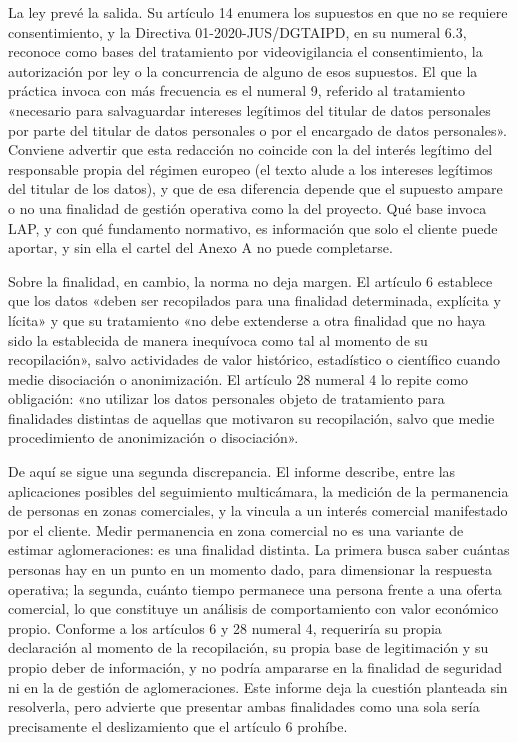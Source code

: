La ley prevé la salida. Su artículo 14 enumera los supuestos en que no
se requiere consentimiento, y la Directiva 01-2020-JUS/DGTAIPD, en su
numeral 6.3, reconoce como bases del tratamiento por videovigilancia el
consentimiento, la autorización por ley o la concurrencia de alguno de
esos supuestos. El que la práctica invoca con más frecuencia es el
numeral 9, referido al tratamiento «necesario para salvaguardar
intereses legítimos del titular de datos personales por parte del
titular de datos personales o por el encargado de datos personales».
Conviene advertir que esta redacción no coincide con la del interés
legítimo del responsable propia del régimen europeo (el texto alude a
los intereses legítimos del titular de los datos), y que de esa
diferencia depende que el supuesto ampare o no una finalidad de gestión
operativa como la del proyecto. Qué base invoca LAP, y con qué
fundamento normativo, es información que solo el cliente puede aportar,
y sin ella el cartel del Anexo A no puede completarse.

Sobre la finalidad, en cambio, la norma no deja margen. El artículo 6
establece que los datos «deben ser recopilados para una finalidad
determinada, explícita y lícita» y que su tratamiento «no debe
extenderse a otra finalidad que no haya sido la establecida de manera
inequívoca como tal al momento de su recopilación», salvo actividades de
valor histórico, estadístico o científico cuando medie disociación o
anonimización. El artículo 28 numeral 4 lo repite como obligación: «no
utilizar los datos personales objeto de tratamiento para finalidades
distintas de aquellas que motivaron su recopilación, salvo que medie
procedimiento de anonimización o disociación».

De aquí se sigue una segunda discrepancia. El informe describe, entre
las aplicaciones posibles del seguimiento multicámara, la medición de la
permanencia de personas en zonas comerciales, y la vincula a un interés
comercial manifestado por el cliente. Medir permanencia en zona
comercial no es una variante de estimar aglomeraciones: es una finalidad
distinta. La primera busca saber cuántas personas hay en un punto en un
momento dado, para dimensionar la respuesta operativa; la segunda,
cuánto tiempo permanece una persona frente a una oferta comercial, lo
que constituye un análisis de comportamiento con valor económico propio.
Conforme a los artículos 6 y 28 numeral 4, requeriría su propia
declaración al momento de la recopilación, su propia base de
legitimación y su propio deber de información, y no podría ampararse en
la finalidad de seguridad ni en la de gestión de aglomeraciones. Este
informe deja la cuestión planteada sin resolverla, pero advierte que
presentar ambas finalidades como una sola sería precisamente el
deslizamiento que el artículo 6 prohíbe.

